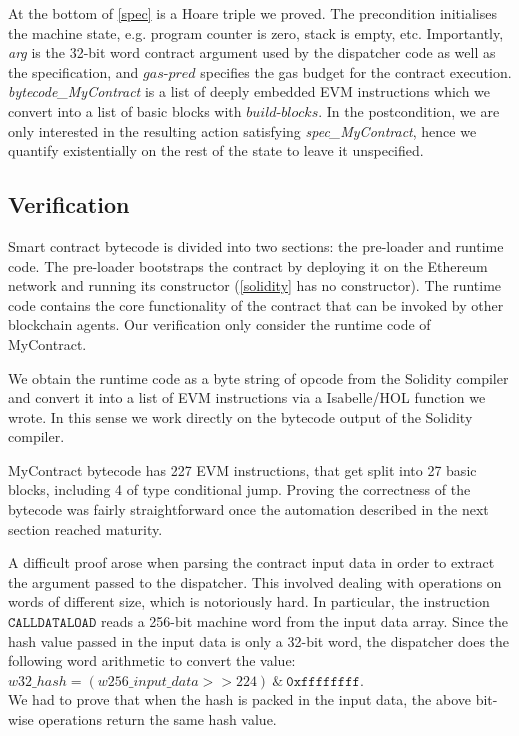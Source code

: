 \documentclass[sigplan,10pt,review]{acmart}\settopmatter{printfolios=true,printccs=false,printacmref=false}
\newcommand{\gaspred}{\mathit{gas\mbox{-}pred}}
\newcommand{\instr}[1]{\mathtt{#1}}
\newcommand{\bblocks}{\mathit{build\mbox{-}blocks}}
\begin{document}
At the bottom of \autoref{spec} is a Hoare triple we proved.
The precondition initialises the machine state, e.g. program counter is zero,
stack is empty, etc. Importantly, \textit{arg} is the 32-bit word contract
argument used by the dispatcher code as well as the specification,
and $\gaspred$ specifies the gas budget for the contract execution.
\textit{bytecode\_MyContract} is a list of deeply embedded EVM
instructions which we convert into a list of basic blocks with $\bblocks$.
In the postcondition, we are only interested in the resulting action
satisfying \textit{spec\_MyContract}, hence we quantify existentially
on the rest of the state to leave it unspecified.

\subsection{Verification}


Smart contract bytecode is divided into two sections: the pre-loader and
runtime code.
The pre-loader bootstraps the contract by deploying it on the
Ethereum network and running its constructor (\autoref{solidity}
has no constructor).
The runtime code contains the core functionality of the contract
that can be invoked by other blockchain agents.
Our verification only consider the runtime code of MyContract.

We obtain the runtime code as a byte string of opcode from the Solidity
compiler and convert it into a list of EVM instructions via a
Isabelle/HOL function we wrote.
In this sense we work directly on the bytecode output of
the Solidity compiler.

MyContract bytecode has 227 EVM instructions, that get split into 27 basic
blocks, including 4 of type conditional jump.
Proving the correctness of the bytecode was fairly straightforward
once the automation described in the next section reached maturity.

A difficult proof arose when parsing the contract input data
in order to extract the argument passed to the dispatcher.
This involved dealing with operations on words of different size,
which is notoriously hard.
In particular, the instruction $\instr{CALLDATALOAD}$ reads a
256-bit machine word from the input data array.
Since the hash value passed in the input data is only a 32-bit word,
the dispatcher does the following word arithmetic to convert the value:\\
$w32\_hash = (w256\_input\_data >> 224)\ \&\ \mathtt{0xffffffff}$.\\
We had to prove that when the hash is packed in the input data,
the above bit-wise operations return the same hash value.
\end{document}
